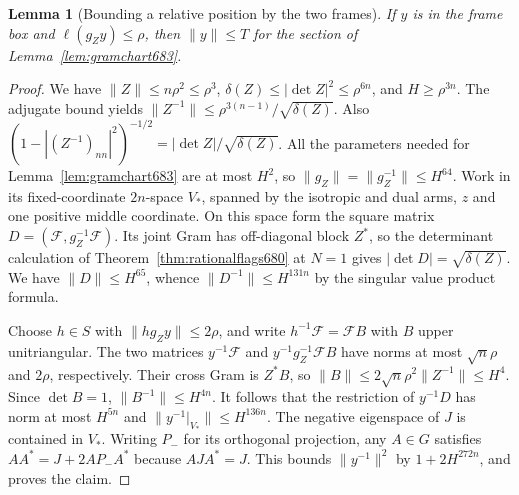\documentclass[a4paper,11pt]{article}
\newtheorem{lemma}[proposition]{Lemma}
\theoremstyle{definition}
\theoremstyle{remark}
\numberwithin{equation}{section}
\begin{document}
\begin{lemma}[Bounding a relative position by the two frames]
\leavevmode\label{lem:pairbox685}
If \(y\) is in the frame box and \(\ell(g_Z y)\le\rho\), then
\(\|y\|\le T\) for the section of Lemma~\ref{lem:gramchart683}.
\end{lemma}
\begin{proof}
We have \(\|Z\|\le n\rho^2\le\rho^3\),
\(\delta(Z)\le|\det Z|^2\le\rho^{6n}\), and \(H\ge\rho^{3n}\).
The adjugate bound yields
\(\|Z^{-1}\|\le\rho^{3(n-1)}/\sqrt{\delta(Z)}\).
Also \((1-|(Z^{-1})_{nn}|^2)^{-1/2}
=|\det Z|/\sqrt{\delta(Z)}\). All the parameters needed for
Lemma~\ref{lem:gramchart683} are at most \(H^2\), so
\(\|g_Z\|=\|g_Z^{-1}\|\le H^{64}\).
Work in its fixed-coordinate \(2n\)-space \(V_*\), spanned by
the isotropic and dual arms, \(z\) and one positive middle
coordinate. On this space form the square matrix
\(D=(\mathcal F,g_Z^{-1}\mathcal F)\). Its joint Gram has
off-diagonal block \(Z^*\), so the determinant calculation of
Theorem~\ref{thm:rationalflags680} at \(N=1\) gives
\(|\det D|=\sqrt{\delta(Z)}\). We have \(\|D\|\le H^{65}\), whence
\(\|D^{-1}\|\le H^{131n}\) by the singular value product formula.

Choose \(h\in S\) with \(\|h g_Zy\|\le2\rho\), and write
\(h^{-1}\mathcal F=\mathcal F B\) with \(B\) upper unitriangular.
The two matrices \(y^{-1}\mathcal F\) and
\(y^{-1}g_Z^{-1}\mathcal F B\) have norms at most \(\sqrt n\rho\)
and \(2\rho\), respectively. Their cross Gram is \(Z^*B\),
so \(\|B\|\le 2\sqrt n\rho^2\|Z^{-1}\|\le H^4\). Since
\(\det B=1\), \(\|B^{-1}\|\le H^{4n}\). It follows that the
restriction of \(y^{-1}D\) has norm at most \(H^{5n}\) and
\(\|y^{-1}|_{V_*}\|\le H^{136n}\). The negative eigenspace of
\(J\) is contained in \(V_*\). Writing \(P_-\) for its orthogonal
projection, any \(A\in G\) satisfies
\(AA^*=J+2AP_-A^*\) because \(AJA^*=J\). This bounds
\(\|y^{-1}\|^2\) by \(1+2H^{272n}\), and proves the claim.
\end{proof}
\end{document}
